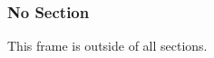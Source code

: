 \begin{frame}
    \frametitle{No Section}

    \begin{block}{This frame is outside of all sections.}
    \end{block}
\end{frame}

